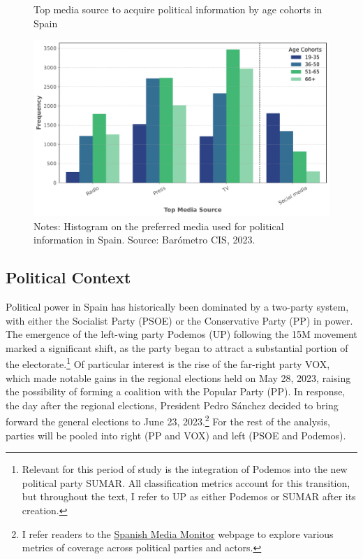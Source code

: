 \documentclass[12pt]{article}
\begin{document}
	\begin{figure}[h!]
		\centering
		\caption{Top media source to acquire political information by age cohorts in Spain}
		\includegraphics[width=120mm]{figures/age_cohorts}
\caption*{\small Notes: Histogram on the preferred media used for political information in Spain.  
	Source: Barómetro CIS, 2023. }
\label{fig:motivation}
	\end{figure}
	
	

	
	
	\subsection*{Political Context}
	
	Political power in Spain has historically been dominated by a two-party system, with either the Socialist Party (PSOE) or the Conservative Party (PP) in power. The emergence of the left-wing party Podemos (UP) following the 15M movement marked a significant shift, as the party began to attract a substantial portion of the electorate.\footnote{Relevant for this period of study is the integration of Podemos into the new political party SUMAR. All classification metrics account for this transition, but throughout the text, I refer to UP as either Podemos or SUMAR after its creation.} Of particular interest is the rise of the far-right party VOX, which made notable gains in the regional elections held on May 28, 2023, raising the possibility of forming a coalition with the Popular Party (PP). In response, the day after the regional elections, President Pedro Sánchez decided to bring forward the general elections to June 23, 2023.\footnote{I refer readers to the \href{https://luisignaciomenendez.github.io/media_monitor/index.html}{Spanish Media Monitor} webpage to explore various metrics of coverage across political parties and actors.} For the rest of the analysis, parties will be pooled into right (PP and VOX) and left (PSOE and Podemos).
	
\end{document}
